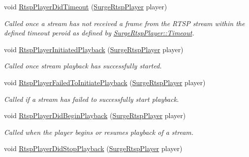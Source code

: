 \begin{DoxyCompactItemize}
\item 
void \hyperlink{interface_surge_xamarini_o_s_bindings_1_1_surge_rtsp_player_delegate_a090498b65f3da84477fc9486e24235a4}{Rtsp\+Player\+Did\+Timeout} (\hyperlink{interface_surge_xamarini_o_s_bindings_1_1_surge_rtsp_player}{Surge\+Rtsp\+Player} player)
\begin{DoxyCompactList}\small\item\em Called once a stream has not received a frame from the R\+T\+SP stream within the defined timeout peroid as defined by \hyperlink{interface_surge_xamarini_o_s_bindings_1_1_surge_rtsp_player_a5d41ebac63bbd4c26859615abcf1fa0e}{Surge\+Rtsp\+Player\+::\+Timeout}. \end{DoxyCompactList}\item 
void \hyperlink{interface_surge_xamarini_o_s_bindings_1_1_surge_rtsp_player_delegate_a086947a6da6d523853a8cfacd4be654a}{Rtsp\+Player\+Initiated\+Playback} (\hyperlink{interface_surge_xamarini_o_s_bindings_1_1_surge_rtsp_player}{Surge\+Rtsp\+Player} player)
\begin{DoxyCompactList}\small\item\em Called once stream playback has successfully started. \end{DoxyCompactList}\item 
void \hyperlink{interface_surge_xamarini_o_s_bindings_1_1_surge_rtsp_player_delegate_a50991332700fd45a8a2771e35bd6016c}{Rtsp\+Player\+Failed\+To\+Initiate\+Playback} (\hyperlink{interface_surge_xamarini_o_s_bindings_1_1_surge_rtsp_player}{Surge\+Rtsp\+Player} player)
\begin{DoxyCompactList}\small\item\em Called if a stream has failed to successfully start playback. \end{DoxyCompactList}\item 
void \hyperlink{interface_surge_xamarini_o_s_bindings_1_1_surge_rtsp_player_delegate_ad4dabfca0a807a5d2e5edb1c0325379d}{Rtsp\+Player\+Did\+Begin\+Playback} (\hyperlink{interface_surge_xamarini_o_s_bindings_1_1_surge_rtsp_player}{Surge\+Rtsp\+Player} player)
\begin{DoxyCompactList}\small\item\em Called when the player begins or resumes playback of a stream. \end{DoxyCompactList}\item 
void \hyperlink{interface_surge_xamarini_o_s_bindings_1_1_surge_rtsp_player_delegate_acbda4e7146444810d2800ad8e6a90d88}{Rtsp\+Player\+Did\+Stop\+Playback} (\hyperlink{interface_surge_xamarini_o_s_bindings_1_1_surge_rtsp_player}{Surge\+Rtsp\+Player} player)

\end{DoxyCompactItemize}
